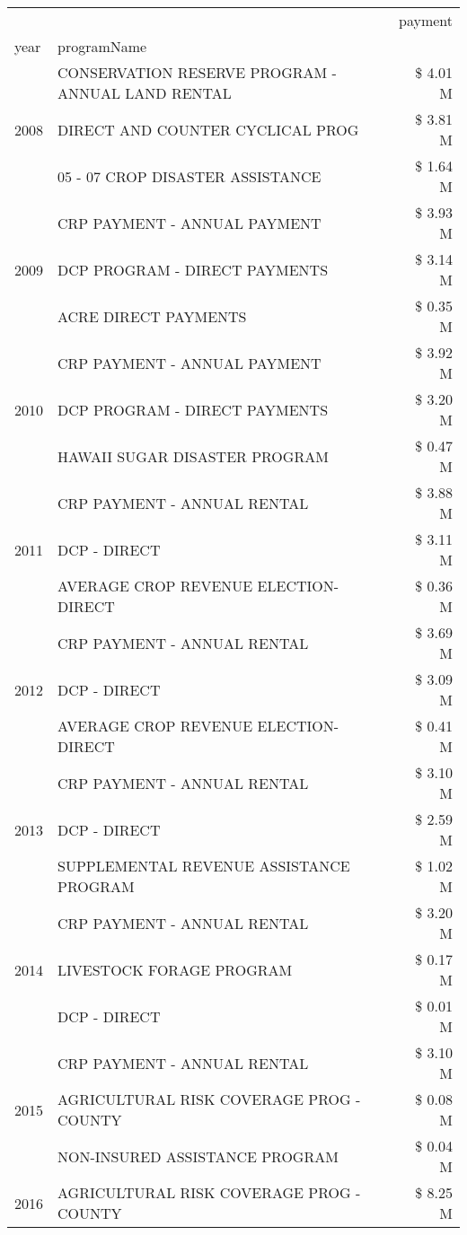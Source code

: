 \begin{tabular}{llr}
\toprule
 &  & payment \\
year & programName &  \\
\midrule
\multirow[t]{3}{*}{2008} & CONSERVATION RESERVE PROGRAM - ANNUAL LAND RENTAL & \$ 4.01 M \\
 & DIRECT AND COUNTER CYCLICAL PROG & \$ 3.81 M \\
 & 05 - 07 CROP DISASTER ASSISTANCE & \$ 1.64 M \\
\cline{1-3}
\multirow[t]{3}{*}{2009} & CRP PAYMENT - ANNUAL PAYMENT & \$ 3.93 M \\
 & DCP PROGRAM - DIRECT PAYMENTS & \$ 3.14 M \\
 & ACRE DIRECT PAYMENTS & \$ 0.35 M \\
\cline{1-3}
\multirow[t]{3}{*}{2010} & CRP PAYMENT - ANNUAL PAYMENT & \$ 3.92 M \\
 & DCP PROGRAM - DIRECT PAYMENTS & \$ 3.20 M \\
 & HAWAII SUGAR DISASTER PROGRAM & \$ 0.47 M \\
\cline{1-3}
\multirow[t]{3}{*}{2011} & CRP PAYMENT - ANNUAL RENTAL & \$ 3.88 M \\
 & DCP - DIRECT & \$ 3.11 M \\
 & AVERAGE CROP REVENUE ELECTION-DIRECT & \$ 0.36 M \\
\cline{1-3}
\multirow[t]{3}{*}{2012} & CRP PAYMENT - ANNUAL RENTAL & \$ 3.69 M \\
 & DCP - DIRECT & \$ 3.09 M \\
 & AVERAGE CROP REVENUE ELECTION-DIRECT & \$ 0.41 M \\
\cline{1-3}
\multirow[t]{3}{*}{2013} & CRP PAYMENT - ANNUAL RENTAL & \$ 3.10 M \\
 & DCP - DIRECT & \$ 2.59 M \\
 & SUPPLEMENTAL REVENUE ASSISTANCE PROGRAM & \$ 1.02 M \\
\cline{1-3}
\multirow[t]{3}{*}{2014} & CRP PAYMENT - ANNUAL RENTAL & \$ 3.20 M \\
 & LIVESTOCK FORAGE PROGRAM & \$ 0.17 M \\
 & DCP - DIRECT & \$ 0.01 M \\
\cline{1-3}
\multirow[t]{3}{*}{2015} & CRP PAYMENT - ANNUAL RENTAL & \$ 3.10 M \\
 & AGRICULTURAL RISK COVERAGE PROG - COUNTY & \$ 0.08 M \\
 & NON-INSURED ASSISTANCE PROGRAM & \$ 0.04 M \\
\cline{1-3}
\multirow[t]{3}{*}{2016} & AGRICULTURAL RISK COVERAGE PROG - COUNTY      & \$ 8.25 M \\

\end{tabular}
